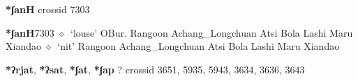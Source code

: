 \item
\textbf{*ʃanH}
  {\tiny crossid 7303}
  \begin{list}{}{\leftmargin=1.5em \itemindent=-1.5em}
  \item {\footnotesize \textbf{*ʃanH}}{\tiny 7303}
         $\diamond$~`louse'
         OBur. 
\hspace{1ex}
         Rangoon 
\hspace{1ex}
         Achang\_Longchuan 
\hspace{1ex}
         Atsi 
\hspace{1ex}
         Bola 
\hspace{1ex}
         Lashi 
\hspace{1ex}
         Maru 
\hspace{1ex}
         Xiandao 
\hspace{1ex}
         $\diamond$~`nit'
         Rangoon 
\hspace{1ex}
         Achang\_Longchuan 
\hspace{1ex}
         Atsi 
\hspace{1ex}
         Bola 
\hspace{1ex}
         Lashi 
\hspace{1ex}
         Maru 
\hspace{1ex}
         Xiandao 
  \end{list}
\item
\textbf{*ʔrjat}, \textbf{*ʔsat}, \textbf{*ʃat}, \textbf{*ʃap}
?
  {\tiny crossid 3651, 5935, 5943, 3634, 3636, 3643}
